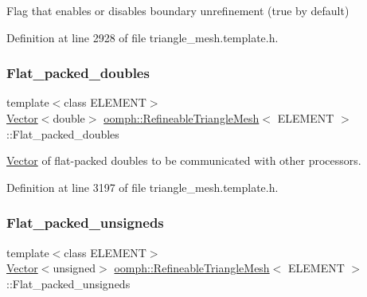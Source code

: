 Flag that enables or disables boundary unrefinement (true by default) 



Definition at line 2928 of file triangle\+\_\+mesh.\+template.\+h.

\mbox{\label{classoomph_1_1RefineableTriangleMesh_afd370f91590e5f7e21194d58c00b6ba0}} 
\subsubsection{\texorpdfstring{Flat\+\_\+packed\+\_\+doubles}{Flat\_packed\_doubles}}
{\footnotesize\ttfamily template$<$class E\+L\+E\+M\+E\+NT$>$ \\
\hyperlink{classoomph_1_1Vector}{Vector}$<$double$>$ \hyperlink{classoomph_1_1RefineableTriangleMesh}{oomph\+::\+Refineable\+Triangle\+Mesh}$<$ E\+L\+E\+M\+E\+NT $>$\+::Flat\+\_\+packed\+\_\+doubles\hspace{0.3cm}{\ttfamily [protected]}}



\hyperlink{classoomph_1_1Vector}{Vector} of flat-\/packed doubles to be communicated with other processors. 



Definition at line 3197 of file triangle\+\_\+mesh.\+template.\+h.

\mbox{\label{classoomph_1_1RefineableTriangleMesh_a162fd7e805e4899cf4590cb5245849f2}} 
\subsubsection{\texorpdfstring{Flat\+\_\+packed\+\_\+unsigneds}{Flat\_packed\_unsigneds}}
{\footnotesize\ttfamily template$<$class E\+L\+E\+M\+E\+NT$>$ \\
\hyperlink{classoomph_1_1Vector}{Vector}$<$unsigned$>$ \hyperlink{classoomph_1_1RefineableTriangleMesh}{oomph\+::\+Refineable\+Triangle\+Mesh}$<$ E\+L\+E\+M\+E\+NT $>$\+::Flat\+\_\+packed\+\_\+unsigneds\hspace{0.3cm}{\ttfamily [protected]}}



